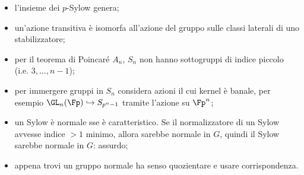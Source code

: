 \begin{itemize}
    \item l'insieme dei $p$-Sylow genera;
    \item un'azione transitiva è isomorfa all'azione del gruppo sulle classi laterali di uno stabilizzatore;
    \item per il teorema di Poincaré $A_n$, $S_n$ non hanno sottogruppi di indice piccolo (i.e. $3, \dots, n-1$);
    \item per immergere gruppi in $S_n$ considera azioni il cui kernel è banale, per esempio $\GL_n(\Fp) \hookrightarrow S_{p^n - 1}$ tramite l'azione su $\Fp^n$;
    \item un Sylow è normale sse è caratteristico. Se il normalizzatore di un Sylow avvesse indice $>1$ minimo, allora sarebbe normale in $G$, quindi il Sylow sarebbe normale in $G$: assurdo;
    \item appena trovi un gruppo normale ha senso quozientare e usare corrispondenza.
\end{itemize}
